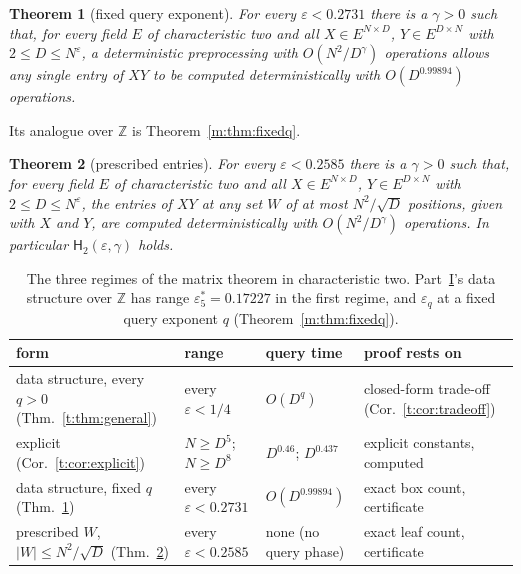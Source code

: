 \documentclass[11pt]{article}
\newtheorem{theorem}{Theorem}[section]
\theoremstyle{definition}
\theoremstyle{remark}
\newcommand{\Z}{\mathbb{Z}}
\newcommand{\es}{\varepsilon^*_5}
\newcommand{\Hyp}{\mathsf{H}}
\newcommand{\RangeVone}{0.17227}%
\newcommand{\HintedOMvMcOurs}{0.2731}%
\newcommand{\CharTwoPrescribed}{0.2585}%
\newcommand{\CharTwoQ}{0.99894}%
\newcommand{\CharTwoAq}{0.46}%
\newcommand{\CharTwoBq}{0.437}%
\begin{document}
\begin{theorem}[fixed query exponent]\label{t:thm:fixedq}
For every $\varepsilon<\HintedOMvMcOurs$ there is a $\gamma>0$ such that, for every field $E$ of characteristic two and all $X\in E^{N\times D}$, $Y\in E^{D\times N}$ with $2\le D\le N^\varepsilon$, a deterministic preprocessing with $O(N^2/D^\gamma)$ operations allows any single entry of $XY$ to be computed deterministically with $O(D^{\CharTwoQ})$ operations.
\end{theorem}
Its analogue over $\Z$ is Theorem~\ref{m:thm:fixedq}.

\begin{theorem}[prescribed entries]\label{t:thm:prescribed}
For every $\varepsilon<\CharTwoPrescribed$ there is a $\gamma>0$ such that, for every field $E$ of characteristic two and all $X\in E^{N\times D}$, $Y\in E^{D\times N}$ with $2\le D\le N^\varepsilon$, the entries of $XY$ at any set $W$ of at most $N^2/\sqrt D$ positions, given with $X$ and $Y$, are computed deterministically with $O(N^2/D^\gamma)$ operations. In particular $\Hyp_2(\varepsilon,\gamma)$ holds.
\end{theorem}

\begin{table}[ht]
\centering\small
\renewcommand{\arraystretch}{1.15}\setlength{\tabcolsep}{4pt}
\begin{tabular}{@{}>{\raggedright}p{}>{\raggedright}p{}>{\raggedright}p{}>{\raggedright\arraybackslash}p{}@{}}
form & range & query time & proof rests on\\\hline
data structure, every $q>0$ (Thm.~\ref{t:thm:general}) & every $\varepsilon<1/4$ & $O(D^q)$ & closed-form trade-off (Cor.~\ref{t:cor:tradeoff})\\
explicit (Cor.~\ref{t:cor:explicit}) & $N\ge D^5$; $N\ge D^8$ & $D^{\CharTwoAq}$; $D^{\CharTwoBq}$ & explicit constants, computed\\
data structure, fixed $q$ (Thm.~\ref{t:thm:fixedq}) & every $\varepsilon<\HintedOMvMcOurs$ & $O(D^{\CharTwoQ})$ & exact box count, certificate\\
prescribed $W$, $|W|\le N^2/\sqrt D$ (Thm.~\ref{t:thm:prescribed}) & every $\varepsilon<\CharTwoPrescribed$ & none (no query phase) & exact leaf count, certificate
\end{tabular}
\caption{The three regimes of the matrix theorem in characteristic two. Part~\protect\hyperref[m:partI]{I}'s data structure over $\Z$ has range $\es=\RangeVone$ in the first regime, and $\varepsilon_q$ at a fixed query exponent $q$ (Theorem~\ref{m:thm:fixedq}).}
\label{t:tab:regimes}
\end{table}
\end{document}
